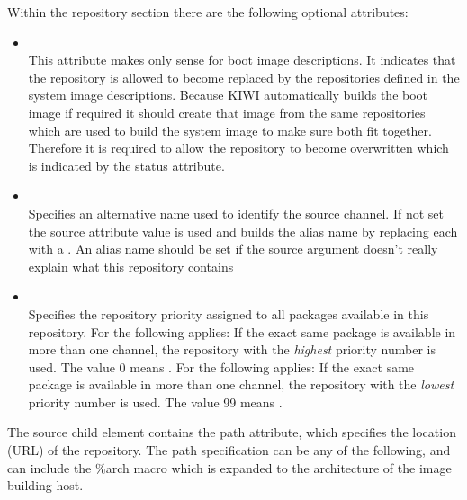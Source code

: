 Within the repository section there are the following optional
attributes:

\begin{itemize}
\item {}\\
      This attribute makes only sense for boot image descriptions.
      It indicates that the repository is allowed to become replaced by
      the repositories defined in the system image descriptions. Because KIWI
      automatically builds the boot image if required it should create that
      image from the same repositories which are used to build the system
      image to make sure both fit together. Therefore it is required to allow
      the repository to become overwritten which is indicated by the status
      attribute.
\item {}\\
      Specifies an alternative name used to identify the source channel.
      If not set the source attribute value is used and builds the alias name
      by replacing each \kquote{/} with a \kquote{\_}. An alias name should be set if
      the source argument doesn't really explain what this repository
      contains 
\item {}\\
      Specifies the repository priority assigned to all packages available in
      this repository. For  the following applies: If the
      exact same package is available in more than one channel, the repository
      with the \emph{highest} priority number is used. The value 0 means
      . For  the following applies:
      If the exact same package is available in more than one channel, the
      repository with the \emph{lowest} priority number is used. The value
      99 means .
\end{itemize}

The source child element contains the path attribute, which specifies
the location (URL) of the repository. The path specification can be any
of the following, and can include the \%arch macro which is expanded
to the architecture of the image building host.

